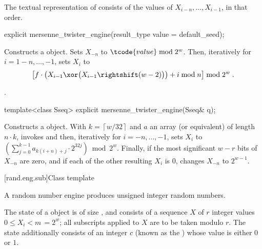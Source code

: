 \pnum
The textual representation%
of 
consists of
the values of
 $X_{i-n}, \ldots, X_{i-1}$,
in that order.

%
\begin{itemdecl}
explicit mersenne_twister_engine(result_type value = default_seed);
\end{itemdecl}

\begin{itemdescr}
\pnum\effects Constructs a  object.
Sets $X_{-n}$ to $\tcode{value} \bmod 2^w$.
 Then, iteratively for $i = 1\!-\!n,\ldots,-1$,
 sets $X_i$
 to
\[%
 \bigl[f \cdot
       \bigl(X_{i-1} \xor \bigl(X_{i-1} \rightshift (w-2)\bigr)
       \bigr)
       + i \bmod n
 \bigr] \bmod 2^w
\; \mbox{.}
\]%

\pnum\complexity {}.
\end{itemdescr}

%
\begin{itemdecl}
template<class Sseq> explicit mersenne_twister_engine(Sseq& q);
\end{itemdecl}

\begin{itemdescr}
\pnum\effects Constructs a  object.
 With
 $ k = \left\lceil w / 32 \right\rceil $
 and $a$ an array (or equivalent)
 of length $ n \cdot k $,
 invokes 
 and then, iteratively for $i = -n,\ldots,-1$,
 sets $X_i$
 to $ \left(\sum_{j=0}^{k-1}a_{k(i+n)+j} \cdot 2^{32j} \right) \bmod 2^w $.
 Finally,
 if the most significant $w-r$ bits of $X_{-n}$
 are zero,
 and if each of the other resulting $X_i$ is $0$,
 changes $X_{-n}$
 to $ 2^{w-1} $.
\end{itemdescr}


[rand.eng.sub]{Class template }%
%

\pnum
A  random number engine
produces unsigned integer random numbers.

\pnum
The state%
%
of a  object 
is of size
,
and consists of
a sequence $X$ of $r$ integer values $0 \leq X_i < m \,= 2^w$;
all subscripts applied to $X$ are to be taken modulo $r$.
The state 
additionally consists of an integer $c$
(known as the )%
%
whose value is either $0$ or $1$.

